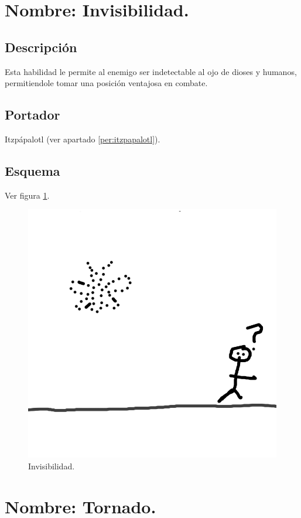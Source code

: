 \section{Nombre: Invisibilidad.} \label{hab.Invis}
\subsection{Descripción}
Esta habilidad le permite al enemigo ser indetectable al ojo de dioses y humanos, permitiendole tomar una posición ventajosa en combate.
\subsection{Portador}
Itzpápalotl (ver apartado \ref{per:itzpapalotl}).
\subsection{Esquema}
			Ver figura \ref{fig:invisibilidad}.
			\begin{figure}
				\centering
				\includegraphics[height=0.2 \textheight]{Imagenes/invisibilidad}
				\caption{Invisibilidad.}
				\label{fig:invisibilidad}
			\end{figure}
\section{Nombre: Tornado.} \label{hab.tornado}
